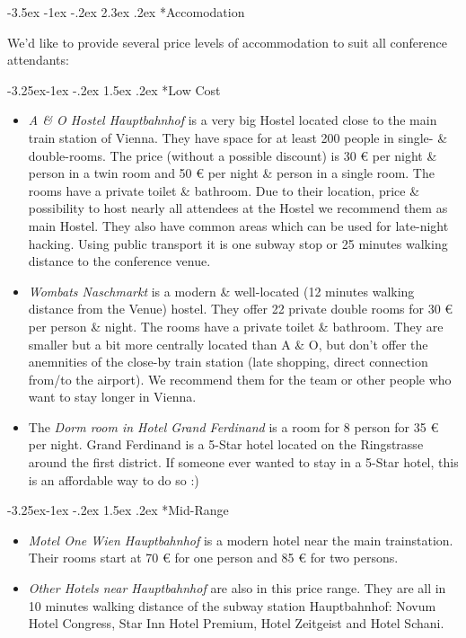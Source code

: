 \documentclass[10pt,a4paper]{article}
\makeatletter
\renewcommand\section{%
\@startsection{section}{1}{\z@}%
              {-3.5ex \@plus -1ex \@minus -.2ex}%
              {2.3ex \@plus.2ex}%
              {\color{kdelight}\sffamily\LARGE\bfseries}}
\renewcommand\subsection{%
\@startsection{subsection}{2}{\z@}%
              {-3.25ex\@plus -1ex \@minus -.2ex}%
              {1.5ex \@plus .2ex}%
              {\color{kdelight}\sffamily\Large\bfseries}}
\makeatother
\begin{document}
\cleardoublepage

\section*{Accomodation}
We'd like to provide several price levels of accommodation to suit all conference attendants:

\subsection*{Low Cost}
\begin{itemize}
\item \emph{A \& O Hostel Hauptbahnhof} is a very big Hostel located close to the main train station of Vienna. They have space for at least 200 people in single- \& double-rooms. The price (without a possible discount) is 30 \euro{} per night \& person in a twin room and 50 \euro{} per night \& person in a single room. The rooms have a private toilet \& bathroom. Due to their location, price \& possibility to host nearly all attendees at the Hostel we recommend them as main Hostel. They also have common areas which can be used for late-night hacking. Using public transport it is one subway stop or 25 minutes walking distance to the conference venue.
\item \emph{Wombats Naschmarkt} is a modern \& well-located (12 minutes walking distance from the Venue) hostel. They offer 22 private double rooms for 30 \euro{} per person \& night. The rooms have a private toilet \& bathroom. They are smaller but a bit more centrally located than A \& O, but don't offer the anemnities of the close-by train station (late shopping, direct connection from/to the airport). We recommend them for the team or other people who want to stay longer in Vienna.
\item The \emph{Dorm room in Hotel Grand Ferdinand}  is a room for 8 person for 35 \euro{} per night. Grand Ferdinand is a 5-Star hotel located on the Ringstrasse around the first district. If someone ever wanted to stay in a 5-Star hotel, this is an affordable way to do so :)
\end{itemize}

\subsection*{Mid-Range}
\begin{itemize}
\item \emph{Motel One Wien Hauptbahnhof} is a modern hotel near the main trainstation. Their rooms start at 70 \euro{} for one person and 85 \euro{} for two persons.
\item \emph{Other Hotels near Hauptbahnhof} are also in this price range. They are all in 10 minutes walking distance of the subway station Hauptbahnhof: Novum Hotel Congress, Star Inn Hotel Premium, Hotel Zeitgeist and Hotel Schani.
\end{itemize}
\end{document}

